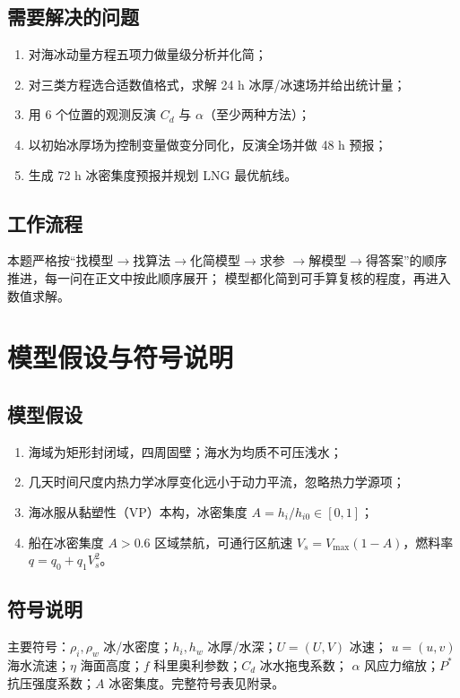 \documentclass[12pt]{ctexart}
\begin{document}
\subsection{需要解决的问题}
\begin{enumerate}[label=\textbf{(\arabic*)}]
	\item 对海冰动量方程五项力做量级分析并化简；
	\item 对三类方程选合适数值格式，求解 24 h 冰厚/冰速场并给出统计量；
	\item 用 6 个位置的观测反演 $C_d$ 与 $\alpha$（至少两种方法）；
	\item 以初始冰厚场为控制变量做变分同化，反演全场并做 48 h 预报；
	\item 生成 72 h 冰密集度预报并规划 LNG 最优航线。
\end{enumerate}

\subsection{工作流程}
本题严格按“找模型$\rightarrow$找算法$\rightarrow$化简模型$\rightarrow$求参
$\rightarrow$解模型$\rightarrow$得答案”的顺序推进，每一问在正文中按此顺序展开；
模型都化简到可手算复核的程度，再进入数值求解。

\section{模型假设与符号说明}
\subsection{模型假设}
\begin{enumerate}[label=\textbf{假设 \arabic*：}]
	\item 海域为矩形封闭域，四周固壁；海水为均质不可压浅水；
	\item 几天时间尺度内热力学冰厚变化远小于动力平流，忽略热力学源项；
	\item 海冰服从黏塑性（VP）本构，冰密集度 $A=h_i/h_{i0}\in[0,1]$；
	\item 船在冰密集度 $A>0.6$ 区域禁航，可通行区航速
	$V_s=V_{\max}(1-A)$，燃料率 $q=q_0+q_1V_s^2$。
\end{enumerate}

\subsection{符号说明}
主要符号：$\rho_i,\rho_w$ 冰/水密度；$h_i,h_w$ 冰厚/水深；$U=(U,V)$ 冰速；
$u=(u,v)$ 海水流速；$\eta$ 海面高度；$f$ 科里奥利参数；$C_d$ 冰水拖曳系数；
$\alpha$ 风应力缩放；$P^*$ 抗压强度系数；$A$ 冰密集度。完整符号表见附录。
\end{document}
